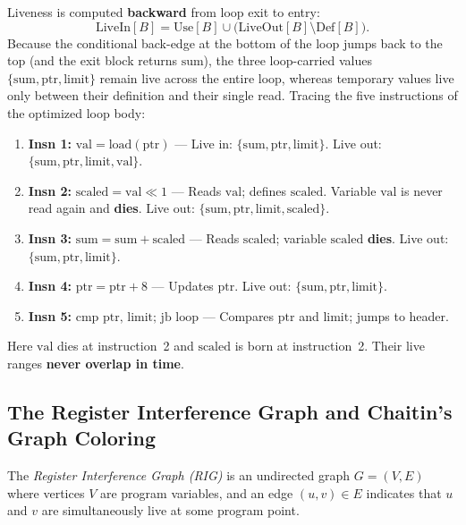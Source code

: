 Liveness is computed \textbf{backward} from loop exit to entry:
\[
  \text{LiveIn}[B] = \text{Use}[B] \cup \bigl(\text{LiveOut}[B] \setminus \text{Def}[B]\bigr).
\]
Because the conditional back-edge at the bottom of the loop jumps back to the top
(and the exit block returns $\text{sum}$), the three loop-carried values
$\{\text{sum}, \text{ptr}, \text{limit}\}$ remain live across the entire loop,
whereas temporary values live only between their definition and their single read.
Tracing the five instructions of the optimized loop body:
\begin{enumerate}
  \item \textbf{Insn 1:} $\text{val} = \text{load}(\text{ptr})$ --- Live in: $\{\text{sum}, \text{ptr}, \text{limit}\}$. Live out: $\{\text{sum}, \text{ptr}, \text{limit}, \text{val}\}$.
  \item \textbf{Insn 2:} $\text{scaled} = \text{val} \ll 1$ --- Reads $\text{val}$; defines $\text{scaled}$. Variable $\text{val}$ is never read again and \textbf{dies}. Live out: $\{\text{sum}, \text{ptr}, \text{limit}, \text{scaled}\}$.
  \item \textbf{Insn 3:} $\text{sum} = \text{sum} + \text{scaled}$ --- Reads $\text{scaled}$; variable $\text{scaled}$ \textbf{dies}. Live out: $\{\text{sum}, \text{ptr}, \text{limit}\}$.
  \item \textbf{Insn 4:} $\text{ptr} = \text{ptr} + 8$ --- Updates $\text{ptr}$. Live out: $\{\text{sum}, \text{ptr}, \text{limit}\}$.
  \item \textbf{Insn 5:} $\text{cmp ptr, limit; jb loop}$ --- Compares $\text{ptr}$ and $\text{limit}$; jumps to header.
\end{enumerate}
Here $\text{val}$ dies at instruction~2 and $\text{scaled}$ is born at
instruction~2. Their live ranges \textbf{never overlap in time}.

\subsection{The Register Interference Graph and Chaitin's Graph Coloring}

\begin{definition}
\label{ch41:def-rig}
The \emph{Register Interference Graph (RIG)} is an undirected graph $G = (V, E)$
where vertices $V$ are program variables, and an edge $(u, v) \in E$ indicates
that $u$ and $v$ are simultaneously live at some program point.
\end{definition}

